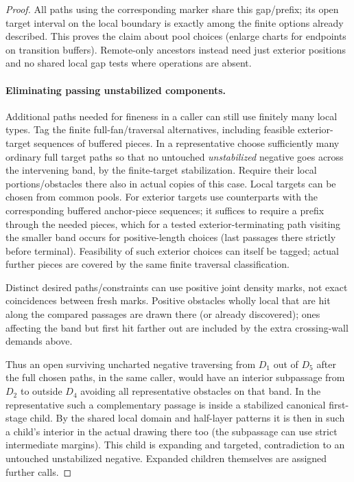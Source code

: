 \begin{proof}
All paths using the corresponding marker share this gap/prefix; its open target interval on the local
boundary is exactly among the finite options already described. This proves the claim about pool choices
(enlarge charts for endpoints on transition buffers). Remote-only ancestors instead need just exterior
positions and no shared local gap tests where operations are absent.

\paragraph{Eliminating passing unstabilized components.}

Additional paths needed for fineness in a caller can still use finitely many local types. Tag the finite
full-fan/traversal alternatives, including feasible exterior-target sequences of buffered pieces. In a
representative choose sufficiently many ordinary full target paths so that no untouched \emph{unstabilized}
negative goes across the intervening band, by the finite-target stabilization. Require their local
portions/obstacles there also in actual copies of this case. Local targets can be chosen from common pools.
For exterior targets use counterparts with the corresponding buffered anchor-piece sequences; it suffices to
require a prefix through the needed pieces, which for a tested exterior-terminating path visiting the
smaller band occurs for positive-length choices (last passages there strictly before terminal). Feasibility
of such exterior choices can itself be tagged; actual further pieces are covered by the same finite
traversal classification.

Distinct desired paths/constraints can use positive joint density marks, not exact
coincidences between fresh marks. Positive obstacles wholly local that are hit along the compared passages
are drawn there (or already discovered); ones affecting the band but first hit farther out are included by
the extra crossing-wall demands above.

Thus an open surviving uncharted negative traversing from \(D_1\) out
of \(D_5\) after the full chosen paths, in the same caller, would have an interior subpassage from \(D_2\)
to outside \(D_4\) avoiding all representative obstacles on that band. In the representative such a
complementary passage is inside a stabilized canonical first-stage child. By the shared local domain and
half-layer patterns it is then in such a child's interior in the actual drawing there too (the subpassage
can use strict intermediate margins). This child is expanding and targeted, contradiction to an untouched
unstabilized negative. Expanded children themselves are assigned further calls.


\end{proof}
